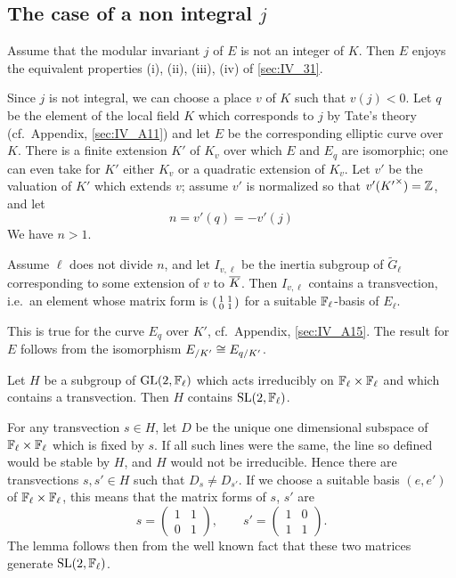 \subsection{The case of a non integral $j$}
\label{sec:IV_32}
\dpage
\begin{thm}
	Assume that the modular invariant $j$ of $E$ is not an integer of $K$.
	Then $E$ enjoys the equivalent properties (i), (ii), (iii), (iv) of
	\ref{sec:IV_31}.
\end{thm}
Since $j$ is not integral, we can choose a place $v$ of $K$ such
that $v(j) < 0$. Let $q$ be the element of the local field $K$ which
corresponds to $j$ by Tate's theory (cf.\ Appendix, \ref{sec:IV_A11}) and let $E$
be the corresponding elliptic curve over $K$. There is a finite
extension $K'$ of $K_v$ over which $E$ and $E_q$ are isomorphic; one
can even take for $K'$ either $K_v$ or a quadratic extension of $K_v$.
Let $v'$ be the valuation of $K'$ which extends $v$; assume $v'$ is
normalized so that $v'({K'}^\times) = \mathbb{Z}$, and let
\[
	n = v'(q) = - v'(j)
\]
We have $n > 1$.

\begin{lem}\label{lem:IV_32_1}
	Assume $\ell$ does not divide $n$, and let $I_{v, \ell}$ be the inertia
	subgroup of $\widetilde{G}_\ell$ corresponding to some extension of $v$
	to $\overline{K}$.  Then $I_{v, \ell}$ contains a transvection, i.e.\ an
	element whose matrix form is $
	\begin{psmallmatrix}
		1 & 1 \\
		0 & 1
	\end{psmallmatrix}
	$ for a suitable $\mathbb{F}_\ell$-basis of $E_\ell$.
\end{lem}
This is true for the curve $E_q$ over $K'$, cf.\ Appendix, \ref{sec:IV_A15}.
The result for $E$ follows from the isomorphism $E_{/K'} \cong E_{q/K'}$.

\begin{lem}\label{lem:IV_32_2}
	Let $H$ be a subgroup of $\operatorname{GL}(2, \mathbb{F}_\ell)$ which acts irreducibly on
	$\mathbb{F}_\ell\times\mathbb{F}_\ell$ and which contains a transvection. Then $H$
	contains $\operatorname{SL}(2, \mathbb{F}_\ell)$.
\end{lem}

\dpage

For any transvection $s \in H$, let $D$ be the unique one dimensional subspace
of $\mathbb{F}_\ell\times\mathbb{F}_\ell$ which is fixed by $s$. If all such lines were the
same, the line so defined would be stable by $H$, and $H$ would not be
irreducible. Hence there are transvections $s, s' \in H$ such that $D_s \ne
D_{s'}$. If we choose a suitable basis $(e,e')$ of $\mathbb{F}_\ell\times\mathbb{F}_\ell$, this
means that the matrix forms of $s$, $s'$ are
\[
	s =
	\begin{pmatrix}
		1 & 1 \\
		0 & 1
	\end{pmatrix}, \qquad s' = 
	\begin{pmatrix}
		1 & 0 \\
		1 & 1
	\end{pmatrix}.
\]
The lemma follows then from the well known fact that these two matrices
generate $\operatorname{SL}(2, \mathbb{F}_\ell)$.

